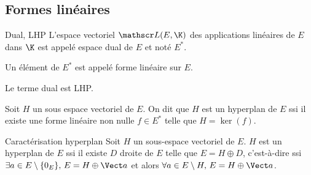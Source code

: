 \subsection{Formes linéaires}

\begin{definition}{Dual, LHP}{}
    L'espace vectoriel $\mathscr L(E, \K)$ des applications linéaires de $E$ dans $\K$ est appelé 
    espace dual de $E$ et noté $E^*$.

    Un élément de $E^*$ est appelé forme linéaire sur $E$.
\end{definition}

\begin{remarque}
    Le terme dual est LHP. 
\end{remarque}

\begin{definition}{}{}
    Soit $H$ un sous espace vectoriel de $E$. On dit que $H$ est un hyperplan de $E$ ssi
    il existe une forme linéaire non nulle $f \in E^*$ telle que $H = \ker(f)$.
\end{definition}

\begin{proposition}{Caractérisation hyperplan}{}
    Soit $H$ un sous-espace vectoriel de $E$. $H$ est un hyperplan de $E$ ssi il existe $D$ droite de $E$ telle que 
    $E = H \oplus D$, c'est-à-dire ssi $\exists a \in E \setminus \{0_E\}, \, E = H \oplus \Vect a$ 
    et alors $\forall a \in E \setminus H, \, E = H \oplus \Vect a$.
\end{proposition}


